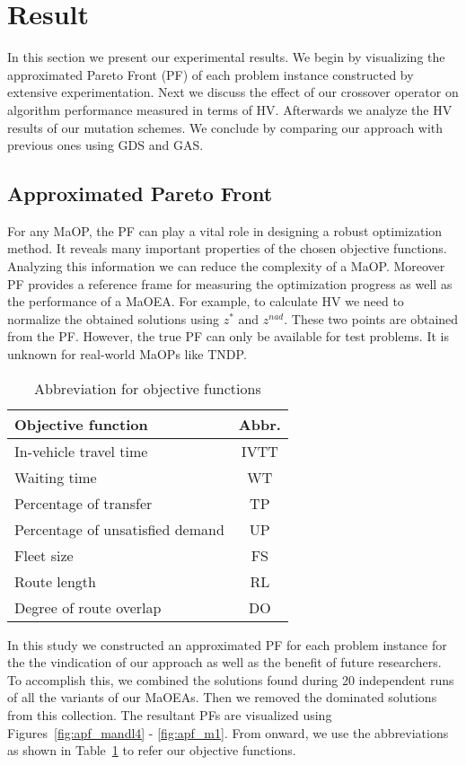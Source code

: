\section{Result}

In this section we present our experimental results. We begin by visualizing the approximated Pareto Front (PF) of each problem instance constructed by extensive experimentation. Next we discuss the effect of our crossover operator on algorithm performance measured in terms of HV. Afterwards we analyze the HV results of our mutation schemes. We conclude by comparing our approach with previous ones using GDS and GAS. 
\subsection{Approximated Pareto Front}
For any MaOP, the PF can play a vital role in designing a robust optimization method. It reveals many important properties of the chosen objective functions. Analyzing this information we can reduce the complexity of a MaOP. Moreover PF provides a reference frame for measuring the optimization progress as well as the performance of a MaOEA. For example, to calculate HV we need to normalize the obtained solutions using $z^*$ and $z^{nad}$. These two points are obtained from the PF. However, the true PF can only be available for test problems. It is unknown for real-world MaOPs like TNDP.  
\begin{table}[!htbp]
	\centering
	\caption{Abbreviation for objective functions}
	\begin{tabular}{|l|c|}
		\hline
		Objective function & Abbr. \\
		\hline
		In-vehicle travel time & IVTT \\
		\hline
		Waiting time & WT \\
		\hline
		Percentage of transfer & TP \\
		\hline
		Percentage of unsatisfied demand & UP \\
		\hline
		Fleet size & FS \\
		\hline
		Route length & RL \\
		\hline
		Degree of route overlap & DO \\
		\hline
	\end{tabular}%
	\label{tab:abbr}%
\end{table}%

In this study we constructed an approximated PF for each problem instance for the the vindication of our approach as well as the benefit of future researchers. To accomplish this, we combined the solutions found during 20 independent runs of all the variants of our MaOEAs. Then we removed the dominated solutions from this collection. The resultant PFs are visualized using Figures~\ref{fig:apf_mandl4} - \ref{fig:apf_m1}. From onward, we use the abbreviations as shown in Table~\ref{tab:abbr} to refer our objective functions. 

